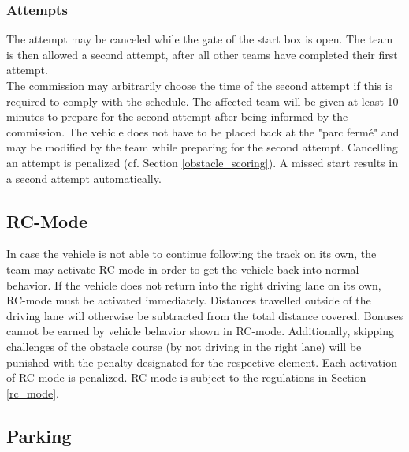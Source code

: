\subsubsection{Attempts}

The attempt may be canceled while the gate of the start box is open. The team
is then allowed a second attempt, after all other teams have completed their
first attempt.\\ The commission may arbitrarily choose the time of the second
attempt if this is required to comply with the schedule. The affected team will
be given at least 10 minutes to prepare for the second attempt after being
informed by the commission. The vehicle does not have to be placed back at the
"parc fermé" and may be modified by the team while preparing for the second
attempt. Cancelling an attempt is penalized (cf. Section
\ref{obstacle_scoring}). A missed start results in a second attempt
automatically.

\subsection{RC-Mode}

In case the vehicle is not able to continue following the track on its own, the
team may activate RC-mode in order to get the vehicle back into normal
behavior. If the vehicle does not return into the right driving lane on its
own, RC-mode must be activated immediately. Distances travelled outside of the
driving lane will otherwise be subtracted from the total distance covered.
Bonuses cannot be earned by vehicle behavior shown in RC-mode. Additionally,
skipping challenges of the obstacle course (by not driving in the right lane)
will be punished with the penalty designated for the respective element. Each
activation of RC-mode is penalized. RC-mode is subject to the regulations in
Section \ref{rc_mode}.

\subsection{Parking}


